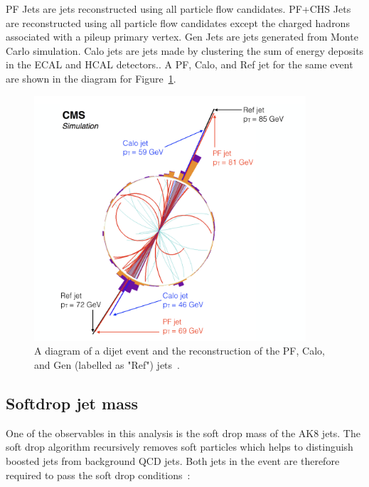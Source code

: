 PF Jets are jets reconstructed using all particle flow candidates. PF+CHS Jets are reconstructed using all particle flow candidates except the charged hadrons associated with a pileup primary vertex. Gen Jets are jets generated from Monte Carlo simulation. Calo jets are jets made by clustering the sum of energy deposits in the ECAL and HCAL detectors.. A PF, Calo, and Ref jet for the same event are shown in the diagram for Figure~\ref{fig:pfjet}.

\begin{figure}[h]
\centering
\includegraphics[width=0.9\textwidth]{figures/pf_jet_diagram}
\caption{A diagram of a dijet event and the reconstruction of the PF, Calo, and Gen (labelled as "Ref") jets~\cite{pflow}.}
\label{fig:pfjet}
\end{figure}


\subsection{Softdrop jet mass}

One of the observables in this analysis is the soft drop mass of the AK8 jets. The soft drop algorithm recursively removes soft particles which helps to distinguish boosted jets from background QCD jets. Both jets in the event are therefore required to pass the soft drop conditions~\cite{softdrop}:
	

